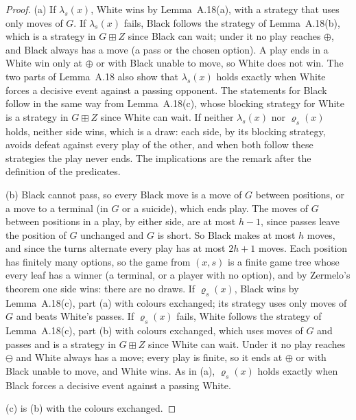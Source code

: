 \begin{proof}
(a) If $\lambda_s(x)$, White wins by Lemma~A.18(a), with a strategy that uses only moves of $G$. If $\lambda_s(x)$
fails, Black follows the strategy of Lemma~A.18(b), which is a strategy in $G\boxplus Z$ since Black can wait; under it no
play reaches $\oplus$, and Black always has a move (a pass or the chosen option). A play ends in a White win only at
$\oplus$ or with Black unable to move, so White does not win. The two parts of Lemma~A.18 also show that $\lambda_s(x)$
holds exactly when White forces a decisive event against a passing opponent. The statements for Black follow in the same
way from Lemma~A.18(c), whose blocking strategy for White is a strategy in $G\boxplus Z$ since White can wait. If neither
$\lambda_s(x)$ nor $\varrho_s(x)$ holds, neither side wins, which is a draw: each side, by its blocking strategy, avoids
defeat against every play of the other, and when both follow these strategies the play never ends. The implications are
the remark after the definition of the predicates.

(b) Black cannot pass, so every Black move is a move of $G$ between positions, or a move to a terminal (in $G$ or a
suicide), which ends play. The moves of $G$ between positions in a play, by either side, are at most $h-1$, since passes
leave the position of $G$ unchanged and $G$ is short. So Black makes at most $h$ moves, and since the turns alternate
every play has at most $2h+1$ moves. Each position has finitely many options, so the game from $(x,s)$ is a finite game
tree whose every leaf has a winner (a terminal, or a player with no option), and by Zermelo's theorem one side
wins: there are no draws. If $\varrho_s(x)$, Black wins by Lemma~A.18(c), part (a) with colours exchanged; its strategy uses only moves of $G$ and
beats White's passes. If $\varrho_s(x)$ fails, White follows the strategy of Lemma~A.18(c), part (b) with colours
exchanged, which uses moves of $G$ and passes and is a strategy in $G\boxplus Z$ since White can wait. Under it no play
reaches $\ominus$ and White always has a move; every play is finite, so it ends at $\oplus$ or with Black unable to move, and
White wins. As in (a), $\varrho_s(x)$ holds exactly when Black forces a decisive event against a passing White.

(c) is (b) with the colours exchanged.
\end{proof}

